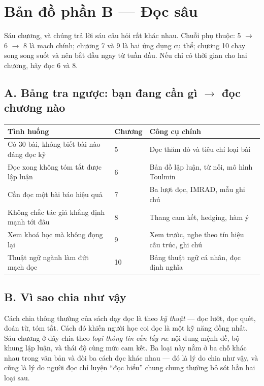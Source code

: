 \documentclass[../english.tex]{subfiles}
\begin{document}
\section*{Bản đồ phần B --- Đọc sâu}

\begin{tomtat}
Sáu chương, và chúng trả lời sáu câu hỏi rất khác nhau. Chuỗi phụ thuộc: 5 \(\rightarrow\) 6 \(\rightarrow\) 8 là mạch chính; chương 7 và 9 là hai ứng dụng cụ thể; chương 10 chạy song song suốt và nên bắt đầu ngay từ tuần đầu. Nếu chỉ có thời gian cho hai chương, hãy đọc 6 và 8.
\end{tomtat}

\subsection*{A. Bảng tra ngược: bạn đang cần gì \(\rightarrow\) đọc chương nào}
\begin{center}\footnotesize
\begin{tabularx}{\linewidth}{@{}L{5.6cm}L{2.0cm}Y@{}}
\toprule
\textbf{Tình huống} & \textbf{Chương} & \textbf{Công cụ chính}\\
\midrule
Có 30 bài, không biết bài nào đáng đọc kỹ & 5 & Đọc thăm dò và tiêu chí loại bài\\
Đọc xong không tóm tắt được lập luận & 6 & Bản đồ lập luận, từ nối, mô hình Toulmin\\
Cần đọc một bài báo hiệu quả & 7 & Ba lượt đọc, IMRAD, mẫu ghi chú\\
Không chắc tác giả khẳng định mạnh tới đâu & 8 & Thang cam kết, hedging, hàm ý\\
Xem khoá học mà không đọng lại & 9 & Xem trước, nghe theo tín hiệu cấu trúc, ghi chú\\
Thuật ngữ ngành làm đứt mạch đọc & 10 & Bảng thuật ngữ cá nhân, đọc định nghĩa\\
\bottomrule
\end{tabularx}
\end{center}

\subsection*{B. Vì sao chia như vậy}
Cách chia thông thường của sách dạy đọc là theo \emph{kỹ thuật} --- đọc lướt, đọc quét, đoán từ, tóm tắt. Cách đó khiến người học coi đọc là một kỹ năng đồng nhất. Sáu chương ở đây chia theo \emph{loại thông tin cần lấy ra}: nội dung mệnh đề, bộ khung lập luận, và thái độ cùng mức cam kết. Ba loại này nằm ở ba chỗ khác nhau trong văn bản và đòi ba cách đọc khác nhau --- đó là lý do chia như vậy, và cũng là lý do người đọc chỉ luyện ``đọc hiểu'' chung chung thường bỏ sót hẳn hai loại sau.
\end{document}
